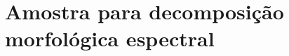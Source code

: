 


\chapter{Amostra para decomposição morfológica espectral}
\label{apendice:amostra}


\footnotesize


